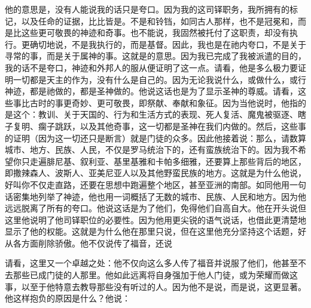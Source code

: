 他的意思是，没有人能说我的话只是夸口。因为我的这司铎职务，我所拥有的标记，以及任命的证据，比比皆是。不是和铃铛，如同古人那样，也不是冠冕和，而是比这些更可敬畏的神迹和奇事。也不能说，我固然被托付了这职责，却没有执行。更确切地说，不是我执行的，而是基督。因此，我也是在祂内夸口，不是关于寻常的事，而是关于属神的事。这就是的意思。因为我已完成了我被派遣的目的，我的话不是夸口，神迹和外邦人的服从便证明了这一点。请看，他是多么极力要证明一切都是天主的作为，没有什么是自己的。因为无论我说什么，或做什么，或行神迹，都是祂做的，都是圣神做的。他说这话也是为了显示圣神的尊威。请看，这些事比古时的事更奇妙、更可敬畏，即祭献、奉献和象征。因为当他说时，他指的是这个：教训、关于天国的、行为和生活方式的表现、死人复活、魔鬼被驱逐、瞎子复明、瘸子跳跃，以及其他奇事，这一切都是圣神在我们内做的。然后，这些事的证明（因为这一切还只是断言）就是门徒的众多。因此他接着说：那么，请数算城市、地方、民族、人民，不仅是罗马统治下的，还有蛮族统治下的。因为我不希望你只走遍腓尼基、叙利亚、基里基雅和卡帕多细雅，还要算上那些背后的地区，即撒辣森人、波斯人、亚美尼亚人以及其他野蛮民族的地方。这就是为什么他说，好叫你不仅走直路，还要在思想中跑遍整个地区，甚至亚洲的南部。如同他用一句话密集地列举了神迹，他也用一词概括了无数的城市、民族、人民和地方。因为他远远脱离了所有的夸口。他说这话是为了他们，免得他们自高自大。他在开头说但这里他说明了他司铎职位的必要性。因为他用更尖锐的语气说话，也借此更清楚地显示了他的权能。这就是为什么他在那里只说，但在这里他充分坚持这个话题，好从各方面削除骄傲。他不仅说传了福音，还说\par

 \par

请看，这里又一个卓越之处：他不仅向这么多人传了福音并说服了他们，他甚至不去那些已成门徒的人那里。他如此远离将自身强加于他人门徒，或为荣耀而做这事，以至于他特意去教导那些没有听过的人。因为他不是说，而是说，这更显著。他这样抱负的原因是什么？他说：\par

